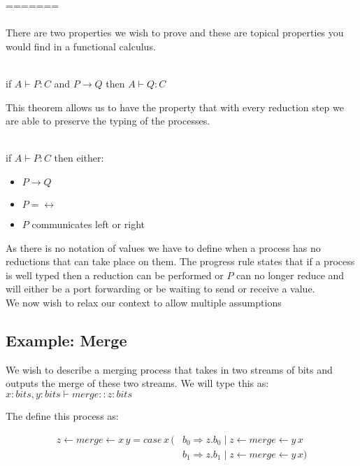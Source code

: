 \documentclass{article}
\begin{document}
=======
\\
\\
There are two properties we wish to prove and these are topical properties you would find in a functional calculus.
\\\\
\begin{theorem}[Preservation]
if \(A \vdash P : C\) and \(P \rightarrow Q\) then \( A \vdash Q:C \)
\end{theorem}


This theorem allows us to have the property that with every reduction step we are able to preserve the typing of the processes.
\\\\
\begin{theorem}[Progress]
if \( A \vdash P:C \) then either:
\begin{itemize}
    \item \(P \rightarrow Q\)
    \item \( P = 	\leftrightarrow\)
    \item \( P\) communicates left or right
\end{itemize}
\end{theorem}
As there is no notation of values we have to define when a process has no reductions that can take place on them. The progress rule states that if a process is well typed then a reduction can be performed or \(P\) can no longer reduce and will either be a port forwarding or be waiting to send or receive a value. 
\\

We now wish to relax our context to allow multiple assumptions

\subsection{Example: Merge}

We wish to describe a merging process that takes in two streams of bits and outputs the merge of these two streams. We will type this as:
\(x : bits , y : bits \vdash merge :: z : bits\)

The define this process as:

\begin{equation*}
\begin{split}
z \leftarrow merge \leftarrow x \, y = case \, x \, ( &  b_0 \Rightarrow z.b_0 \mid z \leftarrow merge \leftarrow y \, x\\
 & b_1 \Rightarrow z.b_1 \mid z \leftarrow merge \leftarrow y \, x ) \\
\end{split}
\end{equation*}
\end{document}
